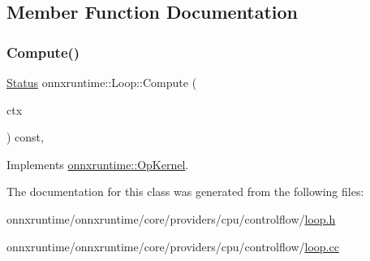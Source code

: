 \subsection{Member Function Documentation}
\mbox{\label{classonnxruntime_1_1Loop_acba8866150bcb6a81d05b59cd55d0b59}} 
\subsubsection{\texorpdfstring{Compute()}{Compute()}}
{\footnotesize\ttfamily \mbox{\hyperlink{classonnxruntime_1_1common_1_1Status}{Status}} onnxruntime\+::\+Loop\+::\+Compute (\begin{DoxyParamCaption}\item[{\mbox{\hyperlink{classonnxruntime_1_1OpKernelContext}{Op\+Kernel\+Context}} $\ast$}]{ctx }\end{DoxyParamCaption}) const\hspace{0.3cm}{\ttfamily [override]}, {\ttfamily [virtual]}}



Implements \mbox{\hyperlink{classonnxruntime_1_1OpKernel_a9eca8656a78b1b3ab9d3351a12798650}{onnxruntime\+::\+Op\+Kernel}}.



The documentation for this class was generated from the following files\+:\begin{DoxyCompactItemize}
\item 
onnxruntime/onnxruntime/core/providers/cpu/controlflow/\mbox{\hyperlink{loop_8h}{loop.\+h}}\item 
onnxruntime/onnxruntime/core/providers/cpu/controlflow/\mbox{\hyperlink{loop_8cc}{loop.\+cc}}\end{DoxyCompactItemize}
